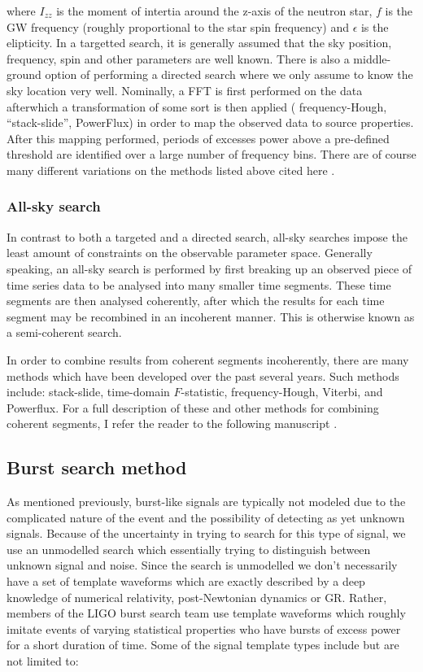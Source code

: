 where $I_{zz}$ is the moment of intertia around the z-axis of the 
neutron star, $f$ is the \ac{GW} frequency (roughly proportional to 
the star spin frequency) and $\epsilon$ is the elipticity. In a targetted 
search, it is generally assumed that the sky position, frequency, spin and 
other parameters are well known. There is also a middle-ground option of 
performing a directed search where we only assume to know the sky location 
very well. Nominally, a \ac{FFT} is first performed on the 
data afterwhich a transformation of some sort is then applied (
frequency-Hough, ``stack-slide'', PowerFlux) in order to 
map the observed data to source properties. After this mapping performed, 
periods of excesses power above 
a pre-defined threshold are identified over a large number of frequency bins. There are of course many different variations on the methods listed above cited here \cite{PhysRevD.90.042002}.

\subsubsection{All-sky search}

In contrast to both a targeted and a directed search, all-sky searches 
impose the least amount of constraints on the observable parameter space. 
Generally speaking, an all-sky search is performed by first breaking up 
an observed piece of time series data to be analysed into many smaller 
time segments. These time segments are then analysed coherently, after which 
the results for each time segment may be recombined in an incoherent manner. 
This is otherwise known as a semi-coherent search.

In order to combine results from coherent segments incoherently, there 
are many methods which have been developed over the past several years. 
Such methods include: stack-slide, time-domain $F$-statistic, frequency-Hough, 
Viterbi, and Powerflux. For a full description of these and other methods for 
combining coherent segments, I refer the reader to the following 
manuscript \cite{PhysRevD.94.124010}.

\subsection{Burst search method}

As mentioned previously, burst-like signals are typically not modeled due to the complicated nature of the event and the possibility of detecting as yet unknown signals. Because of the uncertainty in trying to search for this type of signal, we use an unmodelled search which essentially trying to distinguish between unknown signal and noise. Since the search is unmodelled we don't necessarily have a set of template waveforms which are exactly described by a deep knowledge of numerical relativity, post-Newtonian dynamics or \ac{GR}. Rather, members of the \ac{LIGO} burst search team use template waveforms which roughly imitate events of varying statistical properties who have bursts of excess power for a short duration of time. Some of the signal template types include but are not limited to:

